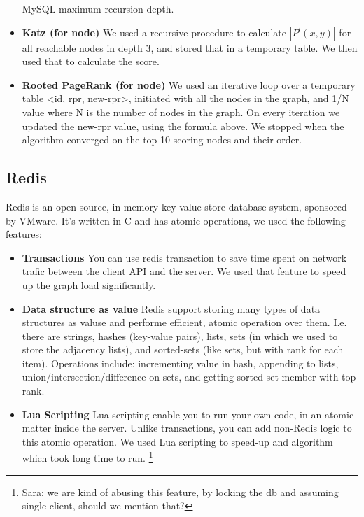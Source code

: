 \begin{itemize}
		MySQL maximum recursion depth.
	\item {\bf Katz (for node)}
		We used a recursive procedure to calculate $|P^l(x,y)|$ for all reachable 
		nodes in depth 3, and stored that in a temporary table. We then used that 
		to calculate the score.
	\item {\bf Rooted PageRank (for node)}
        We used an iterative loop over a temporary table <id, rpr, new-rpr>, 
		initiated with all the nodes in the graph, and 1/N value where N is the 
		number of nodes in the graph. On every iteration we updated the 
		new-rpr value, using the formula above. We stopped when the algorithm
        converged on the top-10 scoring nodes and their order.
\end{itemize}

\subsection{Redis}
Redis is an open-source, in-memory key-value store database system, sponsored
by VMware. It's written in C and has atomic operations, we used the following features:
\begin{itemize}
	\item {\bf Transactions}
        You can use redis transaction to save time spent on network trafic 
        between the client API and the server. We used that feature to speed up
        the graph load significantly.
	\item {\bf Data structure as value}
        Redis support storing many types of data structures as valuse and 
        performe efficient, atomic operation over them. I.e. there are strings,
        hashes (key-value pairs), lists, sets (in which we used to store the 
        adjacency lists), and sorted-sets (like sets, but with rank for each item).
        Operations include: incrementing value in hash, appending to lists, 
        union/intersection/difference on sets, and getting sorted-set member with top rank.
	\item {\bf Lua Scripting}
        Lua scripting enable you to run your own code, in an atomic matter inside the server.
        Unlike transactions, you can add non-Redis logic to this atomic operation. We used 
        Lua scripting to speed-up and algorithm which took long time to run. \footnote{Sara: 
        we are kind of abusing this feature, by locking the db and assuming single client, 
        should we mention that?}
\end{itemize}

